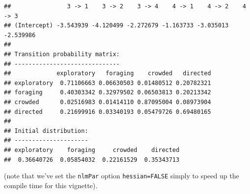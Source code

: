 \documentclass[12pt]{article}\usepackage[]{graphicx}\usepackage[]{color}
\makeatletter
\newenvironment{kframe}{%
 \def\at@end@of@kframe{}%
 \ifinner\ifhmode%
  \def\at@end@of@kframe{\end{minipage}}%
  \begin{minipage}{\columnwidth}%
 \fi\fi%
 \def\FrameCommand##1{\hskip\@totalleftmargin \hskip-\fboxsep
 \colorbox{shadecolor}{##1}\hskip-\fboxsep
     \hskip-\linewidth \hskip-\@totalleftmargin \hskip\columnwidth}%
 \MakeFramed {\advance\hsize-\width
   \@totalleftmargin\z@ \linewidth\hsize
   \@setminipage}}%
 {\par\unskip\endMakeFramed%
 \at@end@of@kframe}
\newenvironment{knitrout}{}{} %
\makeatother
\begin{document}
\begin{knitrout}
\begin{kframe}
\begin{verbatim}
##                3 -> 1    3 -> 2    3 -> 4    4 -> 1    4 -> 2    4 -> 3
## (Intercept) -3.543939 -4.120499 -2.272679 -1.163733 -3.035013 -2.539986
## 
## Transition probability matrix:
## ------------------------------
##             exploratory   foraging    crowded   directed
## exploratory  0.71106663 0.06630503 0.01480512 0.20782321
## foraging     0.40303342 0.32979502 0.06503813 0.20213342
## crowded      0.02516983 0.01414110 0.87095004 0.08973904
## directed     0.21699916 0.03340193 0.05479726 0.69480165
## 
## Initial distribution:
## ---------------------
## exploratory    foraging     crowded    directed 
##  0.36640726  0.05854032  0.22161529  0.35343713
\end{verbatim}
\end{kframe}
\end{knitrout}
\noindent (note that we've set the \verb|nlmPar| option \verb|hessian=FALSE| simply to speed up the compile time for this vignette). 
\end{document}
